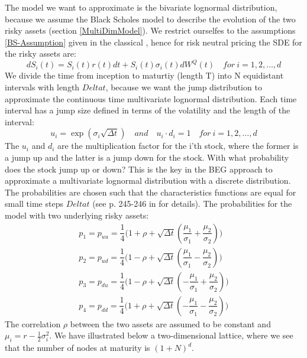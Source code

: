 The model we want to approximate is the bivariate lognormal distribution, because we assume the Black Scholes model to describe the evolution of the two risky assets (section \ref{MultiDimModel}). We restrict ourselfes to the assumptions \ref{BS-Assumption} given in the classical \parencite{B-S-Paper}, hence for risk neutral pricing the SDE for the risky assets are:
$$dS_i(t)=S_i(t)r(t)dt+S_i(t)\sigma_i(t)dW^Q(t) \quad for \ i=1,2,\ldots,d$$
We divide the time from inception to maturtiy (length T) into N equidistant intervals with length $Delta t$, because we want the jump distribution to approximate the continuous time multivariate lognormal distribution. Each time interval has a jump size defined in terms of the volatility and the length of the interval:
$$u_i=\exp(\sigma_i \sqrt{\Delta t}) \quad and \quad u_i \cdot d_i = 1 \quad for \ i=1,2,\ldots,d $$
The $u_i$ and $d_i$ are the multiplication factor for the i'th stock, where the former is a jump up and the latter is a jump down for the stock. With what probability does the stock jump  up or down? This is the key in the BEG approach to approximate a multivariate lognormal distribution with a discrete distribution. The probabilities are chosen such that the characteristics functions are equal for small time steps $Delta t$ (see p. 245-246 in \parencite{BEG} for details). The probabilities for the model with two underlying risky assets:
\begin{equation}
\begin{split}
p_1=p_{uu}=\dfrac{1}{4}\bigg( 1+\rho + \sqrt{\Delta t}(\dfrac{\mu_1}{\sigma_1} + \dfrac{\mu_2}{\sigma_2}) \bigg)\\
p_2=p_{ud}=\dfrac{1}{4}\bigg( 1-\rho + \sqrt{\Delta t}(\dfrac{\mu_1}{\sigma_1} - \dfrac{\mu_2}{\sigma_2}) \bigg)\\
p_3=p_{du}=\dfrac{1}{4}\bigg( 1-\rho + \sqrt{\Delta t}(-\dfrac{\mu_1}{\sigma_1} + \dfrac{\mu_2}{\sigma_2}) \bigg)\\
p_4=p_{dd}=\dfrac{1}{4}\bigg( 1+\rho + \sqrt{\Delta t}(-\dfrac{\mu_1}{\sigma_1} - \dfrac{\mu_2}{\sigma_2}) \bigg)
\end{split}
\end{equation} 
The correlation $\rho$ between the two assets are assumed to be constant and $\mu_i=r-\frac{1}{2}\sigma_i^2$. We have illustrated below a two-dimensional lattice, where we see that the number of nodes at maturity is $(1+N)^d$.

